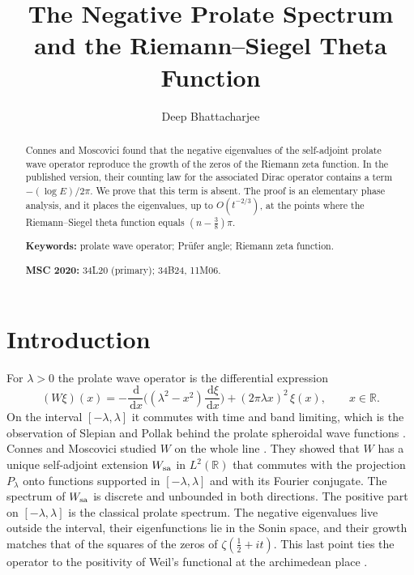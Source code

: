 \documentclass[11pt]{amsart}
\theoremstyle{definition}
\newcommand{\RR}{\mathbb{R}}
\newcommand{\dd}{\,\mathrm{d}}
\begin{document}
\title[The negative prolate spectrum]{The Negative Prolate Spectrum\\ and the Riemann--Siegel Theta Function}

\author{Deep Bhattacharjee}
\address{Formerly, Electro-Gravitational Space Propulsion Laboratory (EGSPL), Bhubaneswar, Odisha 751030, India}
\address{Formerly, University of Calcutta (Heramba Chandra College), 23/49 Gariahat Road, Golpark, Kolkata 700029, West Bengal, India}

\begin{abstract}
Connes and Moscovici found that the negative eigenvalues of the self-adjoint prolate wave operator reproduce the growth of the zeros of the Riemann zeta function. In the published version, their counting law for the associated Dirac operator contains a term $-(\log E)/2\pi$. We prove that this term is absent. The proof is an elementary phase analysis, and it places the eigenvalues, up to $O(t^{-2/3})$, at the points where the Riemann--Siegel theta function equals $(n-\tfrac38)\pi$.

\medskip\noindent\textbf{Keywords:} prolate wave operator; Pr\"ufer angle; Riemann zeta function.

\smallskip\noindent\textbf{MSC 2020:} 34L20 (primary); 34B24, 11M06.
\end{abstract}

\maketitle

\section{Introduction}\label{sec:intro}

For $\lambda>0$ the prolate wave operator is the differential expression
\begin{equation}\label{eq:W}
(W\xi)(x)=-\frac{\dd}{\dd x}\Big((\lambda^2-x^2)\frac{\dd\xi}{\dd x}\Big)+(2\pi\lambda x)^2\,\xi(x),\qquad x\in\RR .
\end{equation}
On the interval $[-\lambda,\lambda]$ it commutes with time and band limiting, which is the observation of Slepian and Pollak behind the prolate spheroidal wave functions \cite{SP61}. Connes and Moscovici studied $W$ on the whole line \cite{CM21,CM22}. They showed that $W$ has a unique self-adjoint extension $W_{\rm sa}$ in $L^2(\RR)$ that commutes with the projection $P_\lambda$ onto functions supported in $[-\lambda,\lambda]$ and with its Fourier conjugate. The spectrum of $W_{\rm sa}$ is discrete and unbounded in both directions. The positive part on $[-\lambda,\lambda]$ is the classical prolate spectrum. The negative eigenvalues live outside the interval, their eigenfunctions lie in the Sonin space, and their growth matches that of the squares of the zeros of $\zeta(\tfrac12+it)$. This last point ties the operator to the positivity of Weil's functional at the archimedean place \cite{CC21}.
\end{document}
